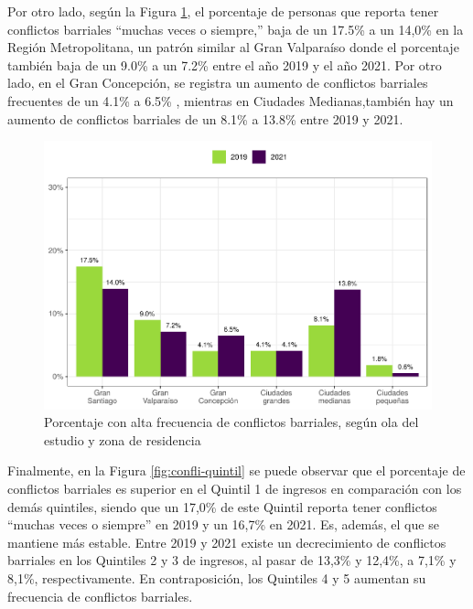 \documentclass[
  12pt,
]{book}
\begin{document}
Por otro lado, según la Figura \ref{fig:confli-estrato}, el porcentaje de personas que reporta tener conflictos barriales ``muchas veces o siempre,'' baja de un 17.5\% a un 14,0\% en la Región Metropolitana, un patrón similar al Gran Valparaíso donde el porcentaje también baja de un 9.0\% a un 7.2\% entre el año 2019 y el año 2021. Por otro lado, en el Gran Concepción, se registra un aumento de conflictos barriales frecuentes de un 4.1\% a 6.5\% , mientras en Ciudades Medianas,también hay un aumento de conflictos barriales de un 8.1\% a 13.8\% entre 2019 y 2021.

\begin{figure}

{\centering \includegraphics{reporte-elsoc_files/figure-latex/confli-estrato-1} 

}

\caption{Porcentaje con alta frecuencia de conflictos barriales, según ola del estudio y zona de residencia}\label{fig:confli-estrato}
\end{figure}

Finalmente, en la Figura \ref{fig:confli-quintil} se puede observar que el porcentaje de conflictos barriales es superior en el Quintil 1 de ingresos en comparación con los demás quintiles, siendo que un 17,0\% de este Quintil reporta tener conflictos ``muchas veces o siempre'' en 2019 y un 16,7\% en 2021. Es, además, el que se mantiene más estable. Entre 2019 y 2021 existe un decrecimiento de conflictos barriales en los Quintiles 2 y 3 de ingresos, al pasar de 13,3\% y 12,4\%, a 7,1\% y 8,1\%, respectivamente. En contraposición, los Quintiles 4 y 5 aumentan su frecuencia de conflictos barriales.
\end{document}
